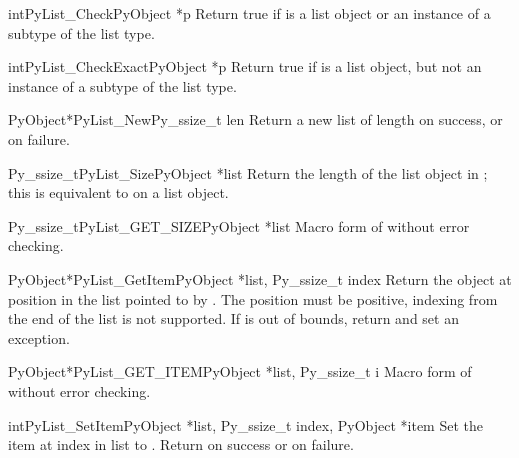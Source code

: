 \begin{cfuncdesc}{int}{PyList_Check}{PyObject *p}
  Return true if  is a list object or an instance of a
  subtype of the list type.
\end{cfuncdesc}

\begin{cfuncdesc}{int}{PyList_CheckExact}{PyObject *p}
  Return true if  is a list object, but not an instance of a
  subtype of the list type.
\end{cfuncdesc}

\begin{cfuncdesc}{PyObject*}{PyList_New}{Py_ssize_t len}
  Return a new list of length  on success, or \NULL{} on
  failure.
\end{cfuncdesc}

\begin{cfuncdesc}{Py_ssize_t}{PyList_Size}{PyObject *list}
  Return the length of the list object in ; this is
  equivalent to  on a list object.
\end{cfuncdesc}

\begin{cfuncdesc}{Py_ssize_t}{PyList_GET_SIZE}{PyObject *list}
  Macro form of  without error checking.
\end{cfuncdesc}

\begin{cfuncdesc}{PyObject*}{PyList_GetItem}{PyObject *list, Py_ssize_t index}
  Return the object at position  in the list pointed to by
  .  The position must be positive, indexing from the end of the
  list is not supported.  If  is out of bounds, return \NULL{}
  and set an  exception.
\end{cfuncdesc}

\begin{cfuncdesc}{PyObject*}{PyList_GET_ITEM}{PyObject *list, Py_ssize_t i}
  Macro form of  without error checking.
\end{cfuncdesc}

\begin{cfuncdesc}{int}{PyList_SetItem}{PyObject *list, Py_ssize_t index,
                                       PyObject *item}
  Set the item at index  in list to .  Return
   on success or  on failure.  
\end{cfuncdesc}

